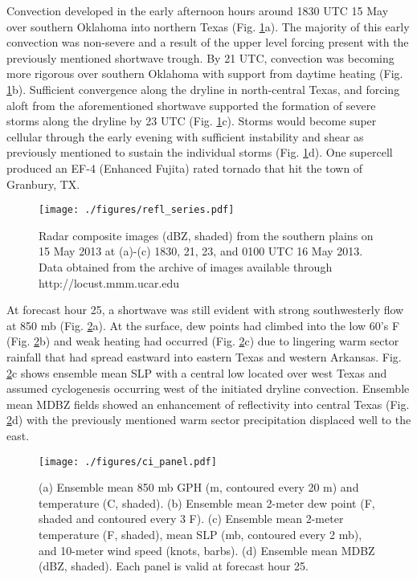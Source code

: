\documentclass{ttuthes2007}
\newcommand{\tab}{\hspace*{2em}}  %
\begin{document}
\tab Convection developed in the early afternoon hours around 1830 UTC 15 May over southern Oklahoma into northern Texas (Fig. \ref{refl_series}a). The majority of this early convection was non-severe and a result of the upper level forcing present with the previously mentioned shortwave trough. By 21 UTC, convection was becoming more rigorous over southern Oklahoma with support from daytime heating (Fig. \ref{refl_series}b). Sufficient convergence along the dryline in north-central Texas, and forcing aloft from the aforementioned shortwave supported the formation of severe storms along the dryline by 23 UTC (Fig. \ref{refl_series}c). Storms would become super cellular through the early evening with sufficient instability and shear as previously mentioned to sustain the individual storms (Fig. \ref{refl_series}d). One supercell produced an EF-4 (Enhanced Fujita) rated tornado that hit the town of Granbury, TX. 

\begin{figure}[!htb]
  \centering
  \noindent\texttt{[image: ./figures/refl\_series.pdf]}\\
  \caption{Radar composite images (dBZ, shaded) from the southern plains on 15 May 2013 at (a)-(c) 1830, 21, 23, and 0100 UTC 16 May 2013. Data obtained from the archive of images available through http://locust.mmm.ucar.edu}
\label{refl_series}
\end{figure}

\tab At forecast hour 25, a shortwave was still evident with strong southwesterly flow at 850 mb (Fig. \ref{ci_panel}a). At the surface, dew points had climbed into the low 60's F (Fig. \ref{ci_panel}b) and weak heating had occurred (Fig. \ref{ci_panel}c) due to lingering warm sector rainfall that had spread eastward into eastern Texas and western Arkansas. Fig. \ref{ci_panel}c shows ensemble mean SLP with a central low located over west Texas and assumed cyclogenesis occurring west of the initiated dryline convection. Ensemble mean MDBZ fields showed an enhancement of reflectivity into central Texas (Fig. \ref{ci_panel}d) with the previously mentioned warm sector precipitation displaced well to the east.  

\begin{figure}[!tb]
  \centering
  \noindent\texttt{[image: ./figures/ci\_panel.pdf]}\\
  \caption{(a) Ensemble mean 850 mb GPH (m, contoured every 20 m) and temperature (C, shaded). (b) Ensemble mean 2-meter dew point (F, shaded and contoured every 3 F). (c) Ensemble mean 2-meter temperature (F, shaded), mean SLP (mb, contoured every 2 mb), and 10-meter wind speed (knots, barbs). (d) Ensemble mean MDBZ (dBZ, shaded). Each panel is valid at forecast hour 25.}
\label{ci_panel}
\end{figure}
\end{document}
